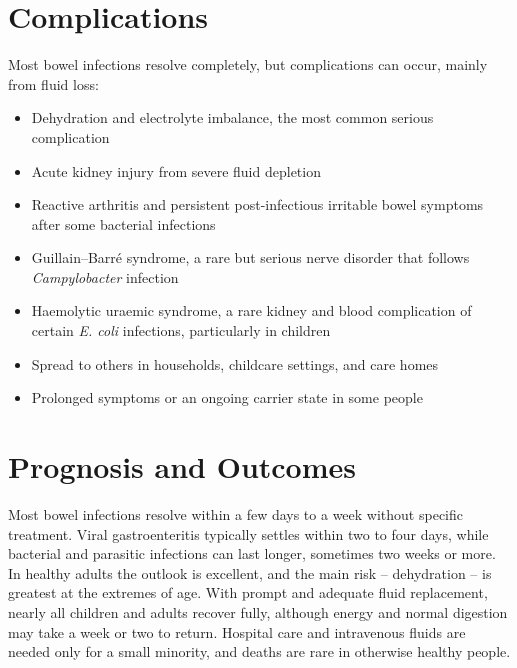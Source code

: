 \section*{Complications}
Most bowel infections resolve completely, but complications can occur, mainly from fluid loss:
\begin{itemize}
    \item Dehydration and electrolyte imbalance, the most common serious complication
    \item Acute kidney injury from severe fluid depletion
    \item Reactive arthritis and persistent post-infectious irritable bowel symptoms after some bacterial infections
    \item Guillain--Barr\'e syndrome, a rare but serious nerve disorder that follows \textit{Campylobacter} infection
    \item Haemolytic uraemic syndrome, a rare kidney and blood complication of certain \textit{E. coli} infections, particularly in children
    \item Spread to others in households, childcare settings, and care homes
    \item Prolonged symptoms or an ongoing carrier state in some people
\end{itemize}

\section*{Prognosis and Outcomes}
Most bowel infections resolve within a few days to a week without specific treatment. Viral gastroenteritis typically settles within two to four days, while bacterial and parasitic infections can last longer, sometimes two weeks or more. In healthy adults the outlook is excellent, and the main risk -- dehydration -- is greatest at the extremes of age. With prompt and adequate fluid replacement, nearly all children and adults recover fully, although energy and normal digestion may take a week or two to return. Hospital care and intravenous fluids are needed only for a small minority, and deaths are rare in otherwise healthy people.

